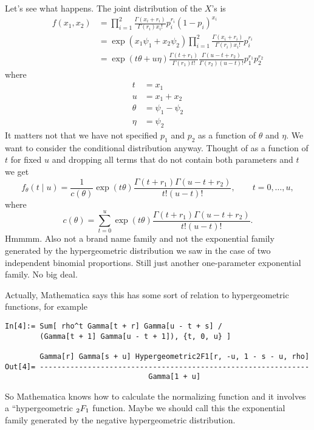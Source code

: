 \documentclass{article}
\begin{document}
Let's see what happens.  The joint distribution of the $X$'s is
\begin{align}
   f(x_1, x_2)
   & =
   \prod_{i = 1}^2
   \frac{\Gamma(x_i + r_i)}{\Gamma(r_i) x_i!} p_i^{r_i} (1 - p_i)^{x_i}
   \nonumber
   \\
   & =
   \exp(x_1 \psi_1 + x_2 \psi_2)
   \prod_{i = 1}^2
   \frac{\Gamma(x_i + r_i)}{\Gamma(r_i) x_i!} p_i^{r_i}
   \nonumber
   \\
   & =
   \exp(t \theta + u \eta)
   \frac{\Gamma(t + r_1)}{\Gamma(r_1) t!}
   \frac{\Gamma(u - t + r_2)}{\Gamma(r_2) (u - t)!}
   p_1^{r_1} p_2^{r_2}
   \label{eq:unnormal}
\end{align}
where
\begin{align*}
   t & = x_1
   \\
   u & = x_1 + x_2
   \\
   \theta & = \psi_1 - \psi_2
   \\
   \eta & = \psi_2
\end{align*}
It matters not that we have not specified $p_1$ and $p_2$ as a function
of $\theta$ and $\eta$.  We want to consider the conditional distribution
anyway.  Thought of as a function of $t$ for fixed $u$ and dropping all terms
that do not contain both parameters and $t$ we get
\begin{equation} \label{eq:neg-hyper-expo}
   f_\theta(t \mid u)
   =
   \frac{1}{c(\theta)}
   \exp(t \theta)
   \frac{\Gamma(t + r_1) \Gamma(u - t + r_2)}{t! (u - t)!},
   \qquad t = 0, \ldots, u,
\end{equation}
where
$$
   c(\theta)
   =
   \sum_{t = 0}^u
   \exp(t \theta)
   \frac{\Gamma(t + r_1) \Gamma(u - t + r_2)}{t! (u - t)!}.
$$
Hmmmm.  Also not a brand name family and not the exponential family generated
by the hypergeometric distribution we saw in the case of two independent
binomial proportions.  Still just another one-parameter exponential family.
No big deal.

Actually, Mathematica says this has some sort of relation to hypergeometric
functions, for example
\begin{verbatim}
In[4]:= Sum[ rho^t Gamma[t + r] Gamma[u - t + s] /
        (Gamma[t + 1] Gamma[u - t + 1]), {t, 0, u} ]

        Gamma[r] Gamma[s + u] Hypergeometric2F1[r, -u, 1 - s - u, rho]
Out[4]= --------------------------------------------------------------
                                 Gamma[1 + u]
\end{verbatim}
So Mathematica knows how to calculate the normalizing function and it
involves a ``hypergeometric $\vphantom{F}_2 F_1$ function.  Maybe we
should call this the exponential family generated by the negative
hypergeometric distribution.
\end{document}
